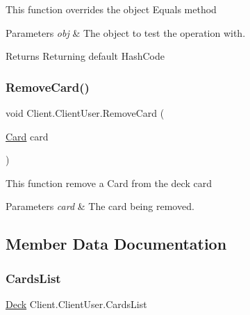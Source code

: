 This function overrides the object \textquotesingle{}Equals\textquotesingle{} method 
\begin{DoxyParams}{Parameters}
{\em obj} & The object to test the operation with. \\
\hline
\end{DoxyParams}
\begin{DoxyReturn}{Returns}
Returning default Hash\+Code 
\end{DoxyReturn}
\mbox{\label{class_client_1_1_client_user_a10a7d16ab41f5fcc15e45a0313bfb53e}} 
\subsubsection{\texorpdfstring{Remove\+Card()}{RemoveCard()}}
{\footnotesize\ttfamily void Client.\+Client\+User.\+Remove\+Card (\begin{DoxyParamCaption}\item[{\hyperlink{class_game_1_1_card}{Card}}]{card }\end{DoxyParamCaption})\hspace{0.3cm}{\ttfamily [inline]}}

This function remove a Card from the deck card 
\begin{DoxyParams}{Parameters}
{\em card} & The card being removed. \\
\hline
\end{DoxyParams}


\subsection{Member Data Documentation}
\mbox{\label{class_client_1_1_client_user_ab274adea6fea7e9b7f637c2d1e0592e7}} 
\subsubsection{\texorpdfstring{Cards\+List}{CardsList}}
{\footnotesize\ttfamily \hyperlink{class_game_1_1_deck}{Deck} Client.\+Client\+User.\+Cards\+List}


